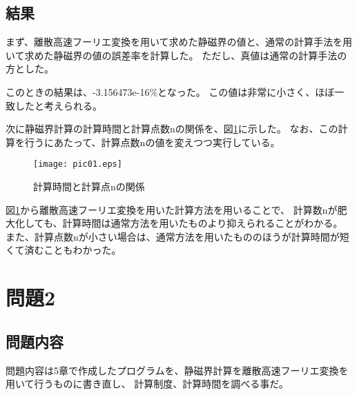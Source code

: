 \documentclass{jsarticle}
\begin{document}
\subsection{結果}
まず、離散高速フーリエ変換を用いて求めた静磁界の値と、通常の計算手法を用いて求めた静磁界の値の誤差率を計算した。
ただし、真値は通常の計算手法の方とした。

このときの結果は、-3.156473e-16$\%$となった。
この値は非常に小さく、ほぼ一致したと考えられる。

次に静磁界計算の計算時間と計算点数nの関係を、図\ref{fig01}に示した。
なお、この計算を行うにあたって、計算点数nの値を変えつつ実行している。
\begin{figure}
	\centering
	\texttt{[image: pic01.eps]}
	\caption{計算時間と計算点nの関係}
	\label{fig01}
\end{figure}

図\ref{fig01}から離散高速フーリエ変換を用いた計算方法を用いることで、
計算数nが肥大化しても、計算時間は通常方法を用いたものより抑えられることがわかる。
また、計算点数nが小さい場合は、通常方法を用いたもののほうが計算時間が短くて済むこともわかった。

\section{問題2}
\subsection{問題内容}
問題内容は5章で作成したプログラムを、静磁界計算を離散高速フーリエ変換を用いて行うものに書き直し、
計算制度、計算時間を調べる事だ。
\end{document}
